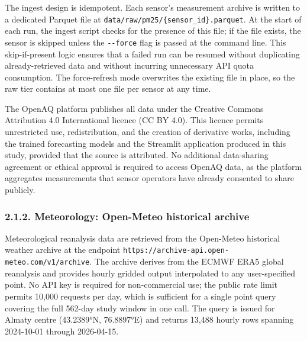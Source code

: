 The ingest design is idempotent. Each sensor's measurement archive is written to a dedicated Parquet file at \texttt{data/raw/pm25/\{sensor\_id\}.parquet}. At the start of each run, the ingest script checks for the presence of this file; if the file exists, the sensor is skipped unless the \texttt{-\/-force} flag is passed at the command line. This skip-if-present logic ensures that a failed run can be resumed without duplicating already-retrieved data and without incurring unnecessary API quota consumption. The force-refresh mode overwrites the existing file in place, so the raw tier contains at most one file per sensor at any time.

The OpenAQ platform publishes all data under the Creative Commons Attribution 4.0 International licence (CC BY 4.0). This licence permits unrestricted use, redistribution, and the creation of derivative works, including the trained forecasting models and the Streamlit application produced in this study, provided that the source is attributed. No additional data-sharing agreement or ethical approval is required to access OpenAQ data, as the platform aggregates measurements that sensor operators have already consented to share publicly.

\subsubsection{2.1.2. Meteorology: Open-Meteo historical archive}\label{meteorology-open-meteo-historical-archive}

Meteorological reanalysis data are retrieved from the Open-Meteo historical weather archive \cite{zippenfenig_openmeteo_2023} at the endpoint \texttt{https://archive-api.open-meteo.com/v1/archive}. The archive derives from the ECMWF ERA5 global reanalysis and provides hourly gridded output interpolated to any user-specified point. No API key is required for non-commercial use; the public rate limit permits 10,000 requests per day, which is sufficient for a single point query covering the full 562-day study window in one call. The query is issued for Almaty centre (43.2389°N, 76.8897°E) and returns 13,488 hourly rows spanning 2024-10-01 through 2026-04-15.

